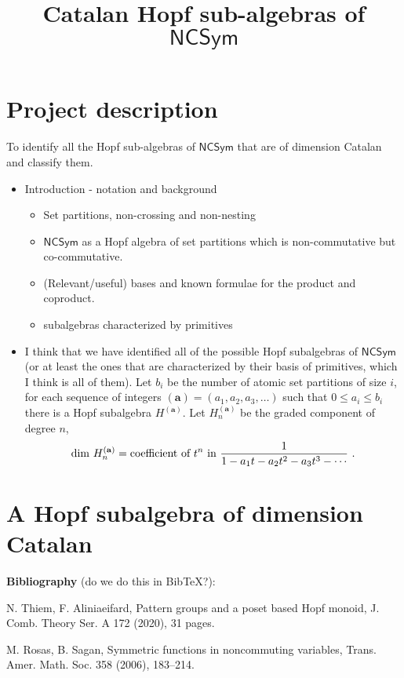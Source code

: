 \documentclass[11pt]{amsart}
\title{Catalan Hopf sub-algebras of $\mathsf{NCSym}$}
\author{}
\theoremstyle{definition}
\numberwithin{equation}{section}
\begin{document}
\maketitle

\section{Project description}

\noindent
To identify all the Hopf sub-algebras of $\mathsf{NCSym}$ that are of dimension Catalan and classify them.


\begin{itemize}
\item Introduction - notation and background
\begin{itemize}
\item Set partitions, non-crossing and non-nesting
\item $\mathsf{NCSym}$ as a Hopf algebra of set partitions which is non-commutative but co-commutative.
\item (Relevant/useful) bases and known formulae for the product and coproduct.
\item subalgebras characterized by primitives
\end{itemize}
\item I think that we have identified all of the possible Hopf subalgebras of $\mathsf{NCSym}$
(or at least the ones that are characterized by their basis of primitives, which I think is all of them).
Let $b_i$ be the number of atomic set partitions of size $i$, for each sequence of integers $(\mathbf{a}) = (a_1, a_2, a_3,\ldots)$ such that
$0 \leq a_i \leq b_i$ there is a Hopf subalgebra $H^{(\mathbf{a})}$.
Let $H^{(\mathbf{a})}_n$ be the graded component of degree $n$,
$$\mathrm{dim}~H^{(\mathbf{a})}_n = \hbox{coefficient of }t^n\hbox{ in }\frac{1}{1 - a_1 t - a_2 t^2 - a_3 t^3 - \cdots}~.$$
\end{itemize}

\section{A Hopf subalgebra of dimension Catalan}

\noindent
{\bf Bibliography} (do we do this in BibTeX?):

N. Thiem, F. Aliniaeifard, Pattern groups and a poset based Hopf monoid, J. Comb. Theory Ser. A 172 (2020), 31 pages.

M. Rosas, B. Sagan, Symmetric functions in noncommuting variables, Trans. Amer. Math. Soc. 358 (2006), 183--214.
\end{document}
